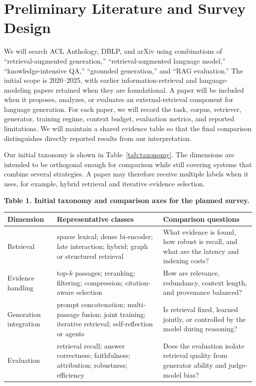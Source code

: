 \documentclass[10.5pt,compsoc]{CjC}
\begin{document}
\section{Preliminary Literature and Survey Design}

We will search ACL Anthology, DBLP, and arXiv using combinations of ``retrieval-augmented generation,'' ``retrieval-augmented language model,'' ``knowledge-intensive QA,'' ``grounded generation,'' and ``RAG evaluation.'' The initial scope is 2020--2025, with earlier information-retrieval and language-modeling papers retained when they are foundational. A paper will be included when it proposes, analyzes, or evaluates an external-retrieval component for language generation. For each paper, we will record the task, corpus, retriever, generator, training regime, context budget, evaluation metrics, and reported limitations. We will maintain a shared evidence table so that the final comparison distinguishes directly reported results from our interpretation.

Our initial taxonomy is shown in Table~\ref{tab:taxonomy}. The dimensions are intended to be orthogonal enough for comparison while still covering systems that combine several strategies. A paper may therefore receive multiple labels when it uses, for example, hybrid retrieval and iterative evidence selection.

\begin{strip}
\centering
{}\label{tab:taxonomy}
\textbf{Table 1. Initial taxonomy and comparison axes for the planned survey.}\par\smallskip
\begin{tabularx}{0.96\textwidth}{>{\raggedright\arraybackslash}p{29mm} X X}
\toprule
\textbf{Dimension} & \textbf{Representative classes} & \textbf{Comparison questions} \\
\midrule
Retrieval & sparse lexical; dense bi-encoder; late interaction; hybrid; graph or structured retrieval & What evidence is found, how robust is recall, and what are the latency and indexing costs? \\
Evidence handling & top-$k$ passages; reranking; filtering; compression; citation-aware selection & How are relevance, redundancy, context length, and provenance balanced? \\
Generation integration & prompt concatenation; multi-passage fusion; joint training; iterative retrieval; self-reflection or agents & Is retrieval fixed, learned jointly, or controlled by the model during reasoning? \\
Evaluation & retrieval recall; answer correctness; faithfulness; attribution; robustness; efficiency & Does the evaluation isolate retrieval quality from generator ability and judge-model bias? \\
\bottomrule
\end{tabularx}
\end{strip}
\end{document}
